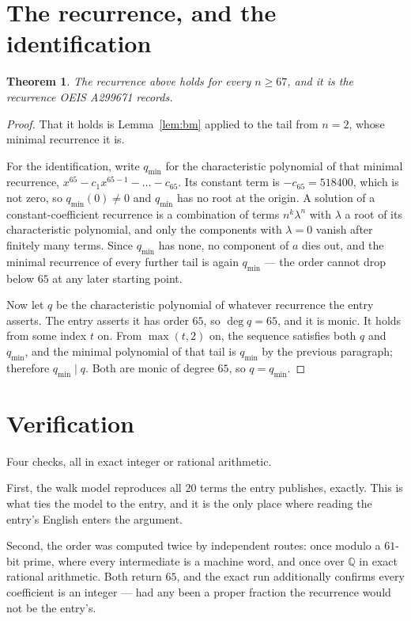 \documentclass[11pt,a4paper]{article}
\theoremstyle{plain}
\newtheorem{theorem}{Theorem}
\theoremstyle{definition}
\begin{document}
\section{The recurrence, and the identification}

\begin{theorem}
The recurrence above holds for every $n\ge67$, and it is the recurrence OEIS A299671 records.
\end{theorem}

\begin{proof}
That it holds is Lemma~\ref{lem:bm} applied to the tail from $n=2$, whose minimal
recurrence it is.

For the identification, write $q_{\min}$ for the characteristic polynomial of that minimal
recurrence, $x^{65}-c_1x^{65-1}-\dots-c_{65}$. Its constant term is
$-c_{65}=518400$, which is not zero, so $q_{\min}(0)\neq0$ and $q_{\min}$ has no
root at the origin. A solution of a constant-coefficient recurrence is a combination of terms
$n^{k}\lambda^{n}$ with $\lambda$ a root of its characteristic polynomial, and only the
components with $\lambda=0$ vanish after finitely many terms. Since $q_{\min}$ has none, no
component of $a$ dies out, and the minimal recurrence of every further tail is again
$q_{\min}$ --- the order cannot drop below $65$ at any later starting point.

Now let $q$ be the characteristic polynomial of whatever recurrence the entry asserts. The
entry asserts it has order $65$, so $\deg q=65$, and it is monic. It holds from some
index $t$ on. From $\max(t,2)$ on, the sequence satisfies both $q$ and $q_{\min}$, and
the minimal polynomial of that tail is $q_{\min}$ by the previous paragraph; therefore
$q_{\min}\mid q$. Both are monic of degree $65$, so $q=q_{\min}$.
\end{proof}

\section{Verification}

Four checks, all in exact integer or rational arithmetic.

First, the walk model reproduces all $20$ terms the entry publishes, exactly. This is
what ties the model to the entry, and it is the only place where reading the entry's English
enters the argument.

Second, the order was computed twice by independent routes: once modulo a $61$-bit prime, where
every intermediate is a machine word, and once over $\mathbb{Q}$ in exact rational arithmetic.
Both return $65$, and the exact run additionally confirms every coefficient is an integer
--- had any been a proper fraction the recurrence would not be the entry's.
\end{document}
